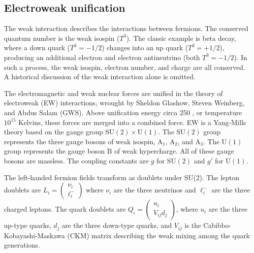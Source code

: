 \subsection{Electroweak unification}
\label{electroweak}
The weak interaction describes the interactions between fermions.
The conserved quantum number is the weak isospin ($T^3$).
The classic example is beta decay, where a down quark ($T^3={-}1/2$) changes into an up quark ($T^3=+1/2$),
producing an additional electron and electron antineutrino (both $T^3={-}1/2$). 
In such a process, the weak isospin, electron number, and charge are all conserved.
A historical discussion of the weak interaction alone is omitted.

The electromagnetic and weak nuclear forces are unified in the theory of electroweak (EW) interactions,
wrought by Sheldon Glashow, Steven Weinberg, and Abdus Salam (GWS).
Above unification energy circa 250 \GeV, or temperature $10^{15}$ Kelvins, these forces are merged into a combined force.
EW is a Yang-Mills theory based on the gauge group $\mathrm{SU}(2) \times \mathrm{U}(1)$.
The $\mathrm{SU}(2)$ group represents the three gauge bosons of weak isospin, 
$\mathrm{A}_1$, $\mathrm{A}_2$, and $\mathrm{A}_3$.
The $\mathrm{U}(1)$ group represents the gauge boson $\mathrm{B}$ of weak hypercharge.
All of these gauge bosons are massless. 
The coupling constants are $g$ for $\mathrm{SU}(2)$ and $g'$ for $\mathrm{U}(1)$.

The left-handed fermion fields transform as doublets under SU(2).
The lepton doublets are $L_i = \begin{pmatrix}\nu_i \\ \ell_i^{-} \end{pmatrix}$ where $\nu_i$ are the three neutrinos and $\ell_i^{-}$ are the three charged leptons.
The quark doublets are $Q_i = \begin{pmatrix} u_i \\ V_{ij} d_j \end{pmatrix}$, 
where $u_i$ are the three up-type quarks, $d_j$ are the three down-type quarks,
and $V_{ij}$ is the Cabibbo-Kobayashi-Maskawa (CKM) matrix describing the weak mixing among the quark generations.

